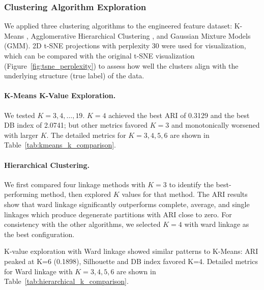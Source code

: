 \documentclass{article}
\begin{document}
\subsubsection{Clustering Algorithm Exploration}

We applied three clustering algorithms to the engineered feature dataset: K-Means \cite{ahmed2020k}, Agglomerative Hierarchical Clustering \cite{murtagh2012algorithms}, and Gaussian Mixture Models (GMM). 2D t-SNE projections with perplexity 30 were used for visualization, which can be compared with the original t-SNE visualization (Figure~\ref{fig:tsne_perplexity}) to assess how well the clusters align with the underlying structure (true label) of the data.

\paragraph{K-Means K-Value Exploration.} We tested $K=3,4,\ldots,19$. $K=4$ achieved the best ARI of 0.3129 and the best DB index of 2.0741; but other metrics favored $K=3$ and monotonically worsened with larger $K$. The detailed metrics for $K=3,4,5,6$ are shown in Table~\ref{tab:kmeans_k_comparison}.

\paragraph{Hierarchical Clustering.} We first compared four linkage methods with $K=3$ to identify the best-performing method, then explored $K$ values for that method. The ARI results show that ward linkage significantly outperforms complete, average, and single linkages which produce degenerate partitions with ARI close to zero. For consistency with the other algorithms, we selected $K=4$ with ward linkage as the best configuration. 

K-value exploration with Ward linkage showed similar patterns to K-Means: ARI peaked at K=6 (0.1898), Silhouette and DB index favored K=4. Detailed metrics for Ward linkage with $K=3,4,5,6$ are shown in Table~\ref{tab:hierarchical_k_comparison}.
\end{document}
